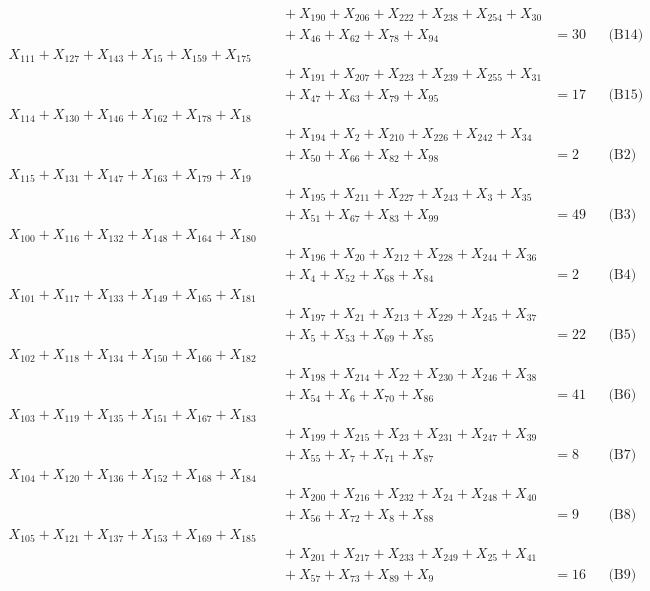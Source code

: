 \documentclass[a4paper,10pt]{article}
\begin{document}
{\begin{align}
&\quad  + X_{190} + X_{206} + X_{222} + X_{238} + X_{254} + X_{30} \\[0.5ex]
&\quad  + X_{46} + X_{62} + X_{78} + X_{94} &= 30 && \text{(B14)} \\
X_{111} + X_{127} + X_{143} + X_{15} + X_{159} + X_{175} \\[0.5ex]
&\quad  + X_{191} + X_{207} + X_{223} + X_{239} + X_{255} + X_{31} \\[0.5ex]
&\quad  + X_{47} + X_{63} + X_{79} + X_{95} &= 17 && \text{(B15)} \\
X_{114} + X_{130} + X_{146} + X_{162} + X_{178} + X_{18} \\[0.5ex]
&\quad  + X_{194} + X_{2} + X_{210} + X_{226} + X_{242} + X_{34} \\[0.5ex]
&\quad  + X_{50} + X_{66} + X_{82} + X_{98} &= 2 && \text{(B2)} \\
X_{115} + X_{131} + X_{147} + X_{163} + X_{179} + X_{19} \\[0.5ex]
&\quad  + X_{195} + X_{211} + X_{227} + X_{243} + X_{3} + X_{35} \\[0.5ex]
&\quad  + X_{51} + X_{67} + X_{83} + X_{99} &= 49 && \text{(B3)} \\
X_{100} + X_{116} + X_{132} + X_{148} + X_{164} + X_{180} \\[0.5ex]
&\quad  + X_{196} + X_{20} + X_{212} + X_{228} + X_{244} + X_{36} \\[0.5ex]
&\quad  + X_{4} + X_{52} + X_{68} + X_{84} &= 2 && \text{(B4)} \\
X_{101} + X_{117} + X_{133} + X_{149} + X_{165} + X_{181} \\[0.5ex]
&\quad  + X_{197} + X_{21} + X_{213} + X_{229} + X_{245} + X_{37} \\[0.5ex]
&\quad  + X_{5} + X_{53} + X_{69} + X_{85} &= 22 && \text{(B5)} \\
X_{102} + X_{118} + X_{134} + X_{150} + X_{166} + X_{182} \\[0.5ex]
&\quad  + X_{198} + X_{214} + X_{22} + X_{230} + X_{246} + X_{38} \\[0.5ex]
&\quad  + X_{54} + X_{6} + X_{70} + X_{86} &= 41 && \text{(B6)} \\
X_{103} + X_{119} + X_{135} + X_{151} + X_{167} + X_{183} \\[0.5ex]
&\quad  + X_{199} + X_{215} + X_{23} + X_{231} + X_{247} + X_{39} \\[0.5ex]
&\quad  + X_{55} + X_{7} + X_{71} + X_{87} &= 8 && \text{(B7)} \\
X_{104} + X_{120} + X_{136} + X_{152} + X_{168} + X_{184} \\[0.5ex]
&\quad  + X_{200} + X_{216} + X_{232} + X_{24} + X_{248} + X_{40} \\[0.5ex]
&\quad  + X_{56} + X_{72} + X_{8} + X_{88} &= 9 && \text{(B8)} \\
X_{105} + X_{121} + X_{137} + X_{153} + X_{169} + X_{185} \\[0.5ex]
&\quad  + X_{201} + X_{217} + X_{233} + X_{249} + X_{25} + X_{41} \\[0.5ex]
&\quad  + X_{57} + X_{73} + X_{89} + X_{9} &= 16 && \text{(B9)} \\
\end{align}}
\end{document}

